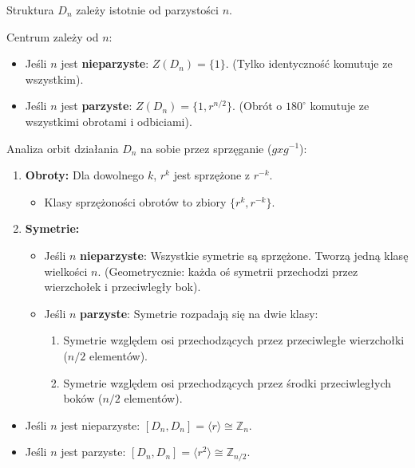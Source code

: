 Struktura $D_n$ zależy istotnie od parzystości $n$.

\begin{theorem}
Centrum zależy od $n$:
\begin{itemize}
    \item Jeśli $n$ jest \textbf{nieparzyste}: $Z(D_n) = \{1\}$. (Tylko identyczność komutuje ze wszystkim).
    \item Jeśli $n$ jest \textbf{parzyste}: $Z(D_n) = \{1, r^{n/2}\}$. (Obrót o $180^\circ$ komutuje ze wszystkimi obrotami i odbiciami).
\end{itemize}
\end{theorem}

\begin{theorem}
Analiza orbit działania $D_n$ na sobie przez sprzęganie ($gxg^{-1}$):
\begin{enumerate}
    \item \textbf{Obroty:} Dla dowolnego $k$, $r^k$ jest sprzężone z $r^{-k}$. 
    \begin{itemize}
        \item Klasy sprzężoności obrotów to zbiory $\{r^k, r^{-k}\}$.
    \end{itemize}
    \item \textbf{Symetrie:}
    \begin{itemize}
        \item Jeśli $n$ \textbf{nieparzyste}: Wszystkie symetrie są sprzężone. Tworzą jedną klasę wielkości $n$. (Geometrycznie: każda oś symetrii przechodzi przez wierzchołek i przeciwległy bok).
        \item Jeśli $n$ \textbf{parzyste}: Symetrie rozpadają się na dwie klasy:
        \begin{enumerate}
            \item Symetrie względem osi przechodzących przez przeciwległe wierzchołki ($n/2$ elementów).
            \item Symetrie względem osi przechodzących przez środki przeciwległych boków ($n/2$ elementów).
        \end{enumerate}
    \end{itemize}
\end{enumerate}
\end{theorem}
\begin{theorem}[Komutant]
\begin{itemize}
    \item Jeśli $n$ jest nieparzyste: $[D_n, D_n] = \langle r \rangle \cong \mathbb{Z}_n$.
    \item Jeśli $n$ jest parzyste: $[D_n, D_n] = \langle r^2 \rangle \cong \mathbb{Z}_{n/2}$.
\end{itemize}
\end{theorem}

